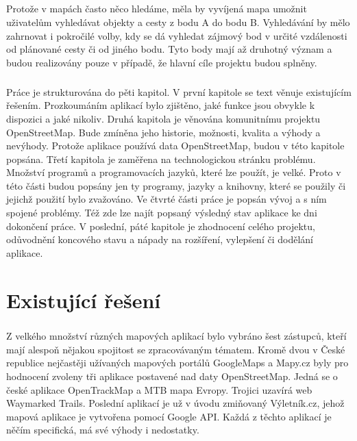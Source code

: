 \documentclass[11pt,a4paper,titlepage,oneside]{book}
\begin{document}
	\paragraph{} Protože v mapách často něco hledáme, měla by vyvíjená mapa umožnit uživatelům vyhledávat objekty a cesty z bodu A do bodu B. Vyhledávání by mělo zahrnovat i pokročilé volby, kdy se dá vyhledat zájmový bod v určité vzdálenosti od plánované cesty či od jiného bodu. Tyto body mají až druhotný význam a budou realizovány pouze v případě, že hlavní cíle projektu budou splněny.
	\paragraph{} Práce je strukturována do pěti kapitol. V první kapitole se text věnuje existujícím řešením. Prozkoumáním aplikací bylo zjištěno, jaké funkce jsou obvykle k dispozici a jaké nikoliv. Druhá kapitola je věnována  komunitnímu projektu OpenStreetMap. Bude zmíněna jeho historie, možnosti, kvalita a výhody a nevýhody. Protože aplikace používá data OpenStreetMap, budou v této kapitole popsána. Třetí kapitola je zaměřena na technologickou stránku problému. Množství programů a programovacích jazyků, které lze použít, je velké. Proto v této části budou popsány jen ty programy, jazyky a knihovny, které se použily či  jejichž použití bylo zvažováno. Ve čtvrté části práce je popsán vývoj a s ním spojené problémy. Též zde lze najít popsaný výsledný stav aplikace ke dni dokončení práce. V poslední, páté kapitole je zhodnocení celého projektu, odůvodnění koncového stavu a nápady na rozšíření, vylepšení či dodělání aplikace.
	
\pagestyle{fancy}

\chapter{Existující řešení}
	\label{sec:Ex_reseni}
	\paragraph{} Z velkého množství různých mapových aplikací bylo vybráno šest zástupců, kteří mají alespoň nějakou spojitost se zpracovávaným tématem. Kromě dvou v České republice nejčastěji užívaných mapových portálů GoogleMaps a Mapy.cz byly pro hodnocení zvoleny tři aplikace postavené nad daty OpenStreetMap. Jedná se o české aplikace OpenTrackMap a MTB mapa Evropy. Trojici uzavírá web Waymarked Trails. Poslední aplikací je už v úvodu zmiňovaný Výletník.cz, jehož mapová aplikace je vytvořena pomocí Google API. Každá z těchto aplikací je něčím specifická, má své výhody i nedostatky. 
\end{document}
